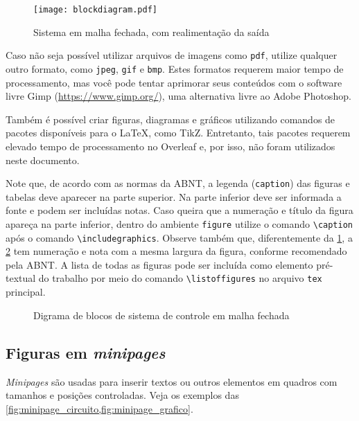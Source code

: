 \begin{figure}[htb]
    \centering
    \caption{Sistema em malha fechada, com realimentação da saída}
    \label{fig:blockdiag1}
    \texttt{[image: blockdiagram.pdf]}
\end{figure}

Caso não seja possível utilizar arquivos de imagens como \texttt{pdf}, utilize qualquer outro formato, como \texttt{jpeg}, \texttt{gif} e \texttt{bmp}. Estes formatos requerem maior tempo de processamento, mas você pode tentar aprimorar seus conteúdos com o software livre \textsf{Gimp} (\url{https://www.gimp.org/}), uma alternativa livre ao Adobe Photoshop.

Também é possível criar figuras, diagramas e gráficos utilizando comandos de pacotes disponíveis para o \LaTeX, como \textsf{TikZ}. Entretanto, tais pacotes requerem elevado tempo de processamento no Overleaf e, por isso, não foram utilizados neste documento.

Note que, de acordo com as normas da ABNT, a legenda (\texttt{caption}) das figuras e tabelas deve aparecer na parte superior. Na parte inferior deve ser informada a fonte e podem ser incluídas notas. Caso queira que a numeração e título da figura apareça na parte inferior, dentro do ambiente \texttt{figure} utilize o comando \verb|\caption| após o comando \verb|\includegraphics|. Observe também que, diferentemente da \cref{fig:blockdiag1}, a \cref{fig:blockdiag2} tem numeração e nota com a mesma largura da figura, conforme recomendado pela ABNT. A lista de todas as figuras pode ser incluída como elemento pré-textual do trabalho por meio do comando \verb|\listoffigures| no arquivo \texttt{tex} principal.

\begin{figure}[htb]
\centering\configurecaptions
\begin{minipage}{\wd0}
  \caption{Digrama de blocos de sistema de controle em malha fechada}
  \label{fig:blockdiag2}
\end{minipage}
\end{figure}

\subsection{Figuras em \emph{minipages}}

\emph{Minipages} são usadas para inserir textos ou outros elementos em quadros com tamanhos e posições controladas. Veja os exemplos das \cref{fig:minipage_circuito,fig:minipage_grafico}.

